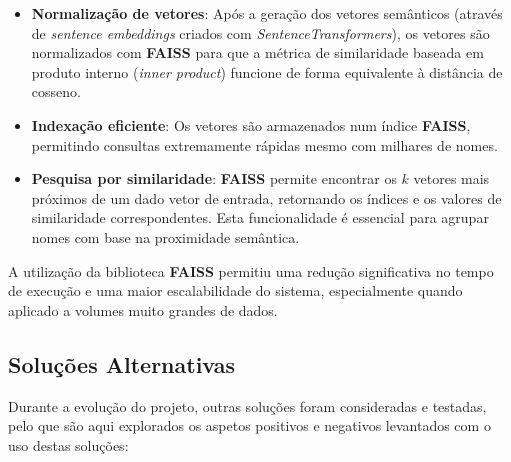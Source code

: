 \documentclass[a4paper,12pt]{article}
\begin{document}
\begin{itemize}
    \item \textbf{Normalização de vetores}: Após a geração dos vetores semânticos (através de \textit{sentence embeddings} criados com \textit{SentenceTransformers}), os vetores são normalizados com \textbf{FAISS} para que a métrica de similaridade baseada em produto interno (\textit{inner product}) funcione de forma equivalente à distância de cosseno.

    \item \textbf{Indexação eficiente}: Os vetores são armazenados num índice \textbf{FAISS}, permitindo consultas extremamente rápidas mesmo com milhares de nomes.

    \item \textbf{Pesquisa por similaridade}: \textbf{FAISS} permite encontrar os $k$ vetores mais próximos de um dado vetor de entrada, retornando os índices e os valores de similaridade correspondentes. Esta funcionalidade é essencial para agrupar nomes com base na proximidade semântica.

\end{itemize}
A utilização da biblioteca \textbf{FAISS} permitiu uma redução significativa no tempo de execução e uma maior escalabilidade do sistema, especialmente quando aplicado a volumes muito grandes de dados.

\subsection{Soluções Alternativas}

Durante a evolução do projeto, outras soluções foram consideradas e testadas, pelo que são aqui explorados os aspetos positivos e negativos levantados com o uso destas soluções:
\end{document}
